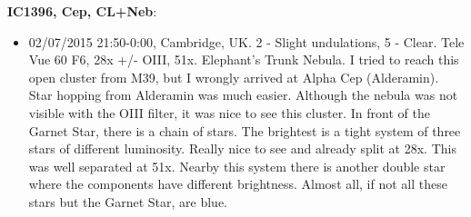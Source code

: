 {\bf IC1396, Cep, CL+Neb}:
\begin{itemize}
\item 02/07/2015 21:50-0:00, Cambridge, UK. 2 - Slight undulations, 5 - Clear. Tele Vue 60 F6, 28x +/- OIII, 51x. Elephant's Trunk Nebula. I tried to reach this open cluster from M39, but I wrongly arrived at Alpha Cep (Alderamin). Star hopping from Alderamin was much easier. Although the nebula was not visible with the OIII filter, it was nice to see this cluster. In front of the Garnet Star, there is a chain of stars. The brightest is a tight system of three stars of different luminosity. Really nice to see and already split at 28x. This was well separated at 51x. Nearby this system there is another double star where the components have different brightness. Almost all, if not all these stars but the Garnet Star, are blue.
\end{itemize}
